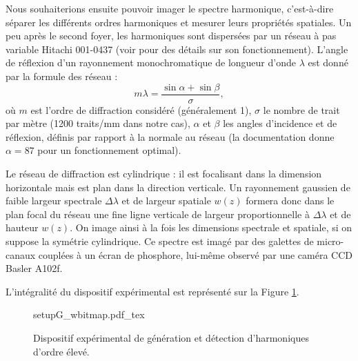 Nous souhaiterions ensuite pouvoir imager le spectre harmonique, c'est-à-dire séparer les différents ordres harmoniques et mesurer leurs propriétés spatiales. Un peu après le second foyer, les harmoniques sont dispersées par un réseau à pas variable Hitachi 001-0437 (voir  pour des détails sur son fonctionnement). L'angle de réflexion d'un rayonnement monochromatique de longueur d'onde $\lambda$ est donné par la formule des réseau :
\begin{equation*}
m\lambda=\frac{\sin{\alpha}+\sin{\beta}}{\sigma},
\end{equation*}
où $m$ est l'ordre de diffraction considéré (généralement 1), $\sigma$ le nombre de trait par mètre (1200 traits/mm dans notre cas), $\alpha$ et $\beta$ les angles d'incidence et de réflexion, définis par rapport à la normale au réseau (la documentation donne $\alpha = 87$\degres{} pour un fonctionnement optimal).\par
Le réseau de diffraction est cylindrique : il est focalisant dans la dimension horizontale mais est plan dans la direction verticale. Un rayonnement gaussien de faible largeur spectrale $\Delta\lambda$ et de largeur spatiale $w(z)$ formera donc dans le plan focal du réseau une fine ligne verticale de largeur proportionnelle à $\Delta\lambda$ et de hauteur $w(z)$. On image ainsi à la fois les dimensions spectrale et spatiale, si on suppose la symétrie cylindrique. Ce spectre est imagé par des galettes de micro-canaux couplées à un écran de phosphore, lui-même observé par une caméra CCD Basler A102f. 

L'intégralité du dispositif expérimental est représenté sur la Figure \ref{Fig:ExpG}.
\newpage
\vspace{\baselineskip}
\begin{figure}[!ht]
\centering
\def\svgwidth{\columnwidth}
{setupG_wbitmap.pdf_tex}
\caption{Dispositif expérimental de génération et détection d'harmoniques d'ordre élevé.}
\label{Fig:ExpG}
\end{figure}


